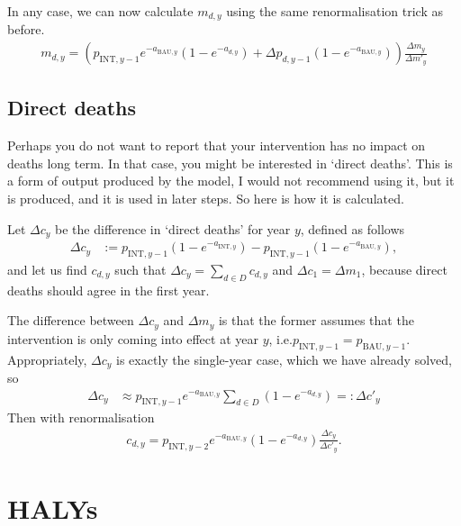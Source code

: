 \documentclass[]{article}
\begin{document}
In any case, we can now calculate $m_{d, y}$ using the same renormalisation trick as before.
\begin{align*}
	m_{d, y} = \left(p_{\text{INT}, y - 1} e^{-a_{\text{BAU}, y}} \left(1 - e^{-a_{d, y}}\right)
	+ \Delta p_{d, y - 1} \left(1 - e^{-a_{\text{BAU}, y}}\right) \right) \frac{\Delta m_y}{\Delta m'_y} 
\end{align*}

\subsection{Direct deaths}

Perhaps you do not want to report that your intervention has no impact on deaths long term. In that case, you might be interested in `direct deaths'. This is a form of output produced by the model, I would not recommend using it, but it is produced, and it is used in later steps. So here is how it is calculated.

Let $\Delta c_y$ be the difference in `direct deaths' for year $y$, defined as follows
\begin{align*}
	\Delta c_y &:= p_{\text{INT}, y - 1} \left(1 - e^{-a_{\text{INT}, y}}\right) - p_{\text{INT}, y - 1} \left(1 - e^{-a_{\text{BAU}, y}}\right),
\end{align*}
and let us find $c_{d, y}$ such that $\Delta c_y = \sum_{d \in D} c_{d, y}$ and $\Delta c_1 = \Delta m_1$, because direct deaths should agree in the first year.

The difference between $\Delta c_y$ and $\Delta m_y$ is that the former assumes that the intervention is only coming into effect at year $y$, i.e.\@ $p_{\text{INT}, y-1} = p_{\text{BAU}, y-1}$. Appropriately, $\Delta c_y$ is exactly the single-year case, which we have already solved, so
\begin{align*}
	\Delta c_y &\approx p_{\text{INT}, y-1} e^{-a_{\text{BAU}, y}} \sum_{d \in D} \left(1 - e^{-a_{d, y}}\right) =: \Delta c'_y
\end{align*}
Then with renormalisation
\begin{align*}
	c_{d, y} = p_{\text{INT}, y-2} e^{-a_{\text{BAU}, y}} \left(1 - e^{-a_{d, y}}\right) \frac{\Delta c_y}{\Delta c'_y}.
\end{align*}

\section{HALYs}
\end{document}
